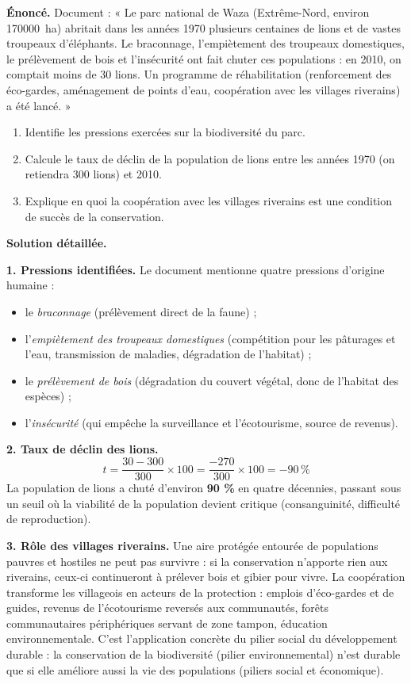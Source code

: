 \documentclass[11pt]{article}
\begin{document}
\begin{exoresolu}
\textbf{Énoncé.} Document : « Le parc national de Waza (Extrême-Nord, environ \SI{170000}{ha}) abritait dans les années 1970 plusieurs centaines de lions et de vastes troupeaux d'éléphants. Le braconnage, l'empiètement des troupeaux domestiques, le prélèvement de bois et l'insécurité ont fait chuter ces populations : en 2010, on comptait moins de 30 lions. Un programme de réhabilitation (renforcement des éco-gardes, aménagement de points d'eau, coopération avec les villages riverains) a été lancé. »
\begin{enumerate}
\item Identifie les pressions exercées sur la biodiversité du parc.
\item Calcule le taux de déclin de la population de lions entre les années 1970 (on retiendra 300 lions) et 2010.
\item Explique en quoi la coopération avec les villages riverains est une condition de succès de la conservation.
\end{enumerate}
\tcblower
\textbf{Solution détaillée.}

\textbf{1. Pressions identifiées.} Le document mentionne quatre pressions d'origine humaine :
\begin{itemize}
\item le \emph{braconnage} (prélèvement direct de la faune) ;
\item l'\emph{empiètement des troupeaux domestiques} (compétition pour les pâturages et l'eau, transmission de maladies, dégradation de l'habitat) ;
\item le \emph{prélèvement de bois} (dégradation du couvert végétal, donc de l'habitat des espèces) ;
\item l'\emph{insécurité} (qui empêche la surveillance et l'écotourisme, source de revenus).
\end{itemize}

\textbf{2. Taux de déclin des lions.}
\[ t = \frac{30 - 300}{300} \times 100 = \frac{-270}{300} \times 100 = -90\,\% \]
La population de lions a chuté d'environ \textbf{90 \%} en quatre décennies, passant sous un seuil où la viabilité de la population devient critique (consanguinité, difficulté de reproduction).

\textbf{3. Rôle des villages riverains.} Une aire protégée entourée de populations pauvres et hostiles ne peut pas survivre : si la conservation n'apporte rien aux riverains, ceux-ci continueront à prélever bois et gibier pour vivre. La coopération transforme les villageois en acteurs de la protection : emplois d'éco-gardes et de guides, revenus de l'écotourisme reversés aux communautés, forêts communautaires périphériques servant de zone tampon, éducation environnementale. C'est l'application concrète du pilier social du développement durable : la conservation de la biodiversité (pilier environnemental) n'est durable que si elle améliore aussi la vie des populations (piliers social et économique).


\end{exoresolu}
\end{document}
